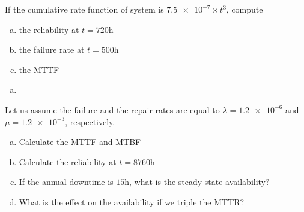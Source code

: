 \documentclass{article}
\begin{document}

\begin{question}
	If the cumulative rate function of system is $\num{7.5e-7}\times t^3$, compute
	\begin{enumerate}[(a)]
		\item the reliability at $t = 720 \unit{\hour}$
		\item the failure rate at $t = 500 \unit{\hour}$
		\item the MTTF
	\end{enumerate}

    \begin{enumerate}[(a)]
        \item 
    \end{enumerate}

\end{question}


\begin{question}
    Let us assume the failure and the repair rates are equal to $\lambda = \num{1.2e-6}$ and $\mu = \num{1.2e-3}$, respectively.
	\begin{enumerate}[(a)]
		\item Calculate the MTTF and MTBF
		\item Calculate the reliability at $t = 8760 \unit{\hour}$
		\item If the annual downtime is $15\unit{\hour}$, what is the steady-state availability?
		\item What is the effect on the availability if we triple the MTTR?
	\end{enumerate}

\end{question}
\end{document}
